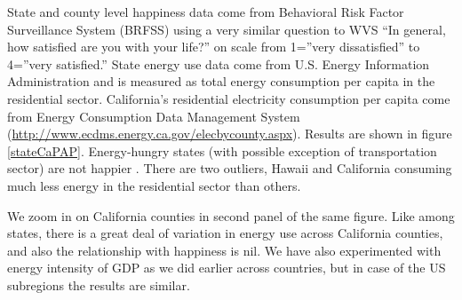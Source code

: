 \documentclass[10pt, letterpaper]{article}
\begin{document}
\begin{spacing}{1.4}
State and county level happiness data come from Behavioral Risk Factor
Surveillance System (BRFSS) using a very similar question to WVS ``In general,
how satisfied are you with your life?'' on scale 
from 1=''very dissatisfied'' to 4=''very satisfied.'' State energy use data come from
U.S. Energy Information Administration and is measured as  total energy
consumption per capita in the residential sector.  
California's  residential electricity consumption per capita come from 
Energy Consumption Data Management System
(\url{http://www.ecdms.energy.ca.gov/elecbycounty.aspx}). Results are shown in
figure \ref{stateCaPAP}. Energy-hungry states (with possible exception of transportation sector) are not happier%
. There are two outliers, Hawaii and California consuming much less energy in
the residential sector than others. 

We zoom in on California counties in
second panel of the same figure. Like among states, there is a great deal of variation in energy
use across California counties, and also the 
relationship with happiness is nil. 
We have also experimented with energy intensity of
GDP as we did earlier across countries, but in case of the US subregions the results are
similar. %


\end{spacing}
\end{document}
